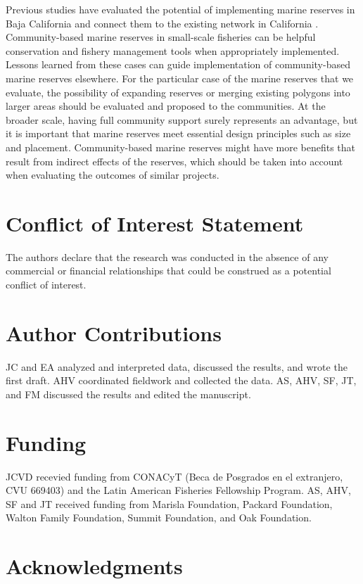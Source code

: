 \documentclass{frontiersSCNS}
\theoremstyle{definition}
\theoremstyle{definition}
\theoremstyle{definition}
\theoremstyle{remark}
\begin{document}
Previous studies have evaluated the potential of implementing marine
reserves in Baja California and connect them to the existing network in
California \citep{arafehdalmau_2017}. Community-based marine reserves in
small-scale fisheries can be helpful conservation and fishery management
tools when appropriately implemented. Lessons learned from these cases
can guide implementation of community-based marine reserves elsewhere.
For the particular case of the marine reserves that we evaluate, the
possibility of expanding reserves or merging existing polygons into
larger areas should be evaluated and proposed to the communities. At the
broader scale, having full community support surely represents an
advantage, but it is important that marine reserves meet essential
design principles such as size and placement. Community-based marine
reserves might have more benefits that result from indirect effects of
the reserves, which should be taken into account when evaluating the
outcomes of similar projects.

\section*{Conflict of Interest Statement}

The authors declare that the research was conducted in the absence of
any commercial or financial relationships that could be construed as a
potential conflict of interest.

\section*{Author Contributions}

JC and EA analyzed and interpreted data, discussed the results, and
wrote the first draft. AHV coordinated fieldwork and collected the data.
AS, AHV, SF, JT, and FM discussed the results and edited the manuscript.

\section*{Funding}

JCVD recevied funding from CONACyT (Beca de Posgrados en el extranjero,
CVU 669403) and the Latin American Fisheries Fellowship Program. AS,
AHV, SF and JT received funding from Marisla Foundation, Packard
Foundation, Walton Family Foundation, Summit Foundation, and Oak
Foundation.

\section*{Acknowledgments}
\end{document}
